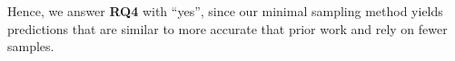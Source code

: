\documentclass{sig-alternative}
\newcommand{\bi}{\begin{itemize}}%
\newcommand{\ei}{\end{itemize}}
\newcommand{\fig}[1]{Figure~\ref{fig:#1}}
\newcommand{\what}{{\bf WHAT }}
\begin{document}
% 








\begin{myshadowbox}
Hence, we answer {\bf RQ4} with ``yes'',
since our minimal sampling method yields predictions that are similar to more accurate that prior
work and rely on fewer samples.
\end{myshadowbox}
\end{document}
